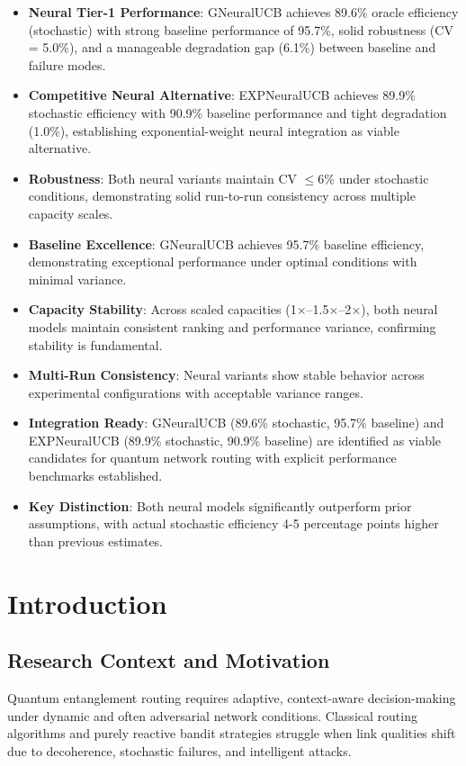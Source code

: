 \documentclass[12pt,a4paper]{article}
\newcommand{\success}[1]{\textcolor{accentgreen}{\textbf{#1}}}
\newcommand{\warning}[1]{\textcolor{warningred}{\textbf{#1}}}
\newcommand{\legacy}[1]{\textcolor{legacycolor}{\textbf{#1}}}
\newcommand{\neural}[1]{\textcolor{neuralcolor}{\textbf{#1}}}
\begin{document}
\begin{tcolorbox}[colback=highlightgray,colframe=primaryblue,title=\textbf{Executive Summary}]
\begin{itemize}
\item \neural{Neural Tier-1 Performance}: GNeuralUCB achieves 89.6\% oracle efficiency (stochastic) with strong baseline performance of 95.7\%, solid robustness (CV = 5.0\%), and a manageable degradation gap (6.1\%) between baseline and failure modes.
\item \legacy{Competitive Neural Alternative}: EXPNeuralUCB achieves 89.9\% stochastic efficiency with 90.9\% baseline performance and tight degradation (1.0\%), establishing exponential-weight neural integration as viable alternative.
\item \success{Robustness}: Both neural variants maintain CV $\leq$6\% under stochastic conditions, demonstrating solid run-to-run consistency across multiple capacity scales.
\item \neural{Baseline Excellence}: GNeuralUCB achieves 95.7\% baseline efficiency, demonstrating exceptional performance under optimal conditions with minimal variance.
\item \success{Capacity Stability}: Across scaled capacities (1$\times$--1.5$\times$--2$\times$), both neural models maintain consistent ranking and performance variance, confirming stability is fundamental.
\item \neural{Multi-Run Consistency}: Neural variants show stable behavior across experimental configurations with acceptable variance ranges.
\item \success{Integration Ready}: GNeuralUCB (89.6\% stochastic, 95.7\% baseline) and EXPNeuralUCB (89.9\% stochastic, 90.9\% baseline) are identified as viable candidates for quantum network routing with explicit performance benchmarks established.
\item \warning{Key Distinction}: Both neural models significantly outperform prior assumptions, with actual stochastic efficiency 4-5 percentage points higher than previous estimates.
\end{itemize}
\end{tcolorbox}

\newpage
\section{Introduction}

\subsection{Research Context and Motivation}
Quantum entanglement routing requires adaptive, context-aware decision-making under dynamic and often adversarial network conditions. Classical routing algorithms and purely reactive bandit strategies struggle when link qualities shift due to decoherence, stochastic failures, and intelligent attacks.
\end{document}
